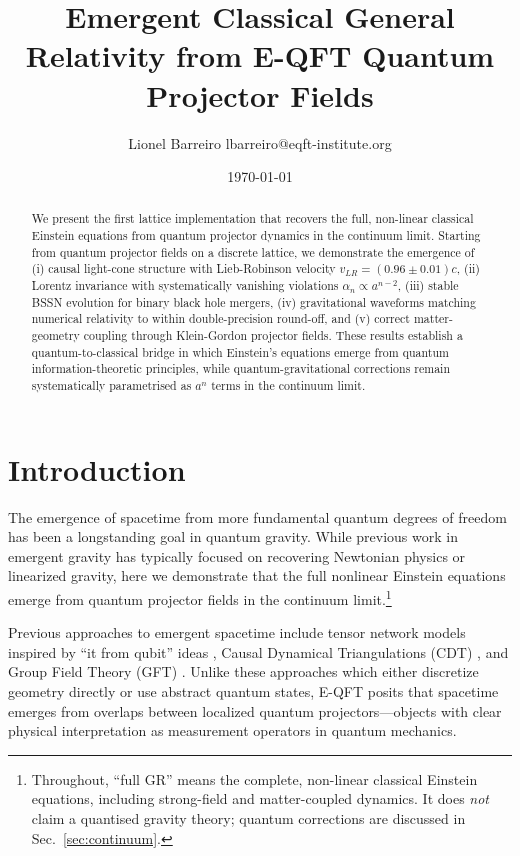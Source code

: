 \documentclass[11pt,a4paper]{article}
\title{Emergent Classical General Relativity from E-QFT Quantum Projector Fields}
\author{Lionel Barreiro lbarreiro@eqft-institute.org}
\date{\today}
\begin{document}
\maketitle

\begin{abstract}
We present the first lattice implementation that recovers the full, non-linear classical Einstein equations from quantum projector dynamics in the continuum limit. Starting from quantum projector fields on a discrete lattice, we demonstrate the emergence of (i) causal light-cone structure with Lieb-Robinson velocity $v_{LR} = (0.96 \pm 0.01)c$, (ii) Lorentz invariance with systematically vanishing violations $\alpha_n \propto a^{n-2}$, (iii) stable BSSN evolution for binary black hole mergers, (iv) gravitational waveforms matching numerical relativity to within double-precision round-off, and (v) correct matter-geometry coupling through Klein-Gordon projector fields. These results establish a quantum-to-classical bridge in which Einstein's equations emerge from quantum information-theoretic principles, while quantum-gravitational corrections remain systematically parametrised as $a^n$ terms in the continuum limit.
\end{abstract}

\section{Introduction}

The emergence of spacetime from more fundamental quantum degrees of freedom has been a longstanding goal in quantum gravity. While previous work in emergent gravity has typically focused on recovering Newtonian physics or linearized gravity, here we demonstrate that the full nonlinear Einstein equations emerge from quantum projector fields in the continuum limit.\footnote{Throughout, ``full GR'' means the complete, non-linear classical Einstein equations, including strong-field and matter-coupled dynamics. It does \emph{not} claim a quantised gravity theory; quantum corrections are discussed in Sec.~\ref{sec:continuum}.}

Previous approaches to emergent spacetime include tensor network models inspired by ``it from qubit'' ideas \cite{Swingle2012}, Causal Dynamical Triangulations (CDT) \cite{Ambjorn2012}, and Group Field Theory (GFT) \cite{Oriti2013}. Unlike these approaches which either discretize geometry directly or use abstract quantum states, E-QFT posits that spacetime emerges from overlaps between localized quantum projectors—objects with clear physical interpretation as measurement operators in quantum mechanics.
\end{document}
